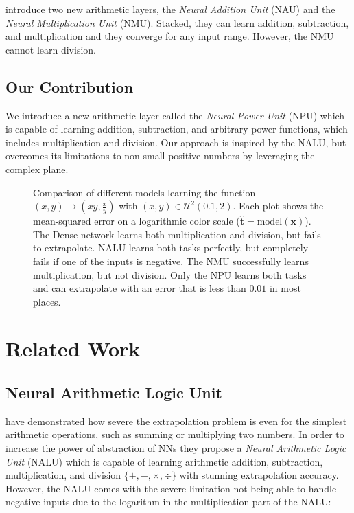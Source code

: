 \documentclass[9pt]{article}
\begin{document}
\cite{madsen_neural_2020} introduce two new arithmetic layers, the \emph{Neural
Addition Unit} (NAU) and the \emph{Neural Multiplication Unit} (NMU).
Stacked, they can learn addition, subtraction, and multiplication and they converge
for any input range. However, the NMU cannot learn division.

\subsection*{Our Contribution}%
\label{sub:our_contribution}

We introduce a new arithmetic layer called the \emph{Neural Power Unit} (NPU)
which is capable of learning addition, subtraction, and arbitrary power
functions, which includes multiplication and division.
Our approach is inspired by the NALU, but overcomes its limitations to
non-small positive numbers by leveraging the complex plane.

\begin{figure}
  \centering
  
  \caption{Comparison of different models learning the function
  $(x,y)\rightarrow(xy,\frac{x}{y})$ with $(x,y)\in\mathcal U^2(0.1,2)$.  Each
  plot shows the mean-squared error on a logarithmic color scale ($\hat{\bm
  t}=\text{model}(\bm x)$).  The Dense network learns both multiplication and
  division, but fails to extrapolate. NALU learns both tasks perfectly, but
  completely fails if one of the inputs is negative.  The NMU successfully
  learns multiplication, but not division. Only the NPU learns both tasks and
  can extrapolate with an error that is less than $0.01$ in most places.}%
  \label{fig:compare-npu-nmu-nalu-xy-xdivy}
\end{figure}

\section{Related Work}%
\label{sec:related_work}

\subsection{Neural Arithmetic Logic Unit}%
\label{sub:neural_arithmetic_logic_unit}

\citet{trask_neural_2018} have demonstrated how severe the extrapolation
problem is even for the simplest arithmetic operations, such as summing or
multiplying two numbers.  In order to increase the power of abstraction of NNs
they propose a \emph{Neural Arithmetic Logic Unit} (NALU) which is capable of
learning arithmetic addition, subtraction, multiplication, and division
$\{+,-,\times,\div\}$ with stunning extrapolation accuracy.  However, the NALU
comes with the severe limitation not being able to handle negative inputs due
to the logarithm in the multiplication part of the NALU:
\end{document}
